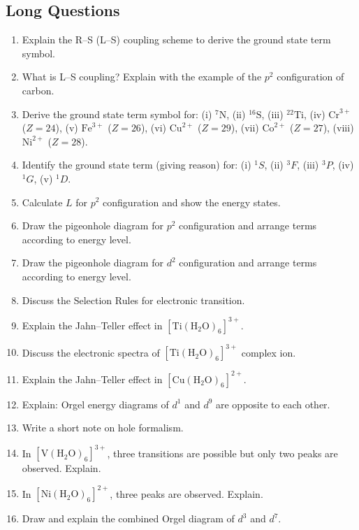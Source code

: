 \documentclass[12pt,a4paper]{article}
\begin{document}
\subsection*{Long Questions}

\begin{enumerate}
  \item Explain the R--S (L--S) coupling scheme to derive the ground state term symbol.
  \item What is L--S coupling? Explain with the example of the $p^2$ configuration of carbon.
  \item Derive the ground state term symbol for: (i) $^7\mathrm{N}$, (ii) $^{16}\mathrm{S}$, (iii) $^{22}\mathrm{Ti}$, (iv) $\mathrm{Cr}^{3+}$ ($Z=24$), (v) $\mathrm{Fe}^{3+}$ ($Z=26$), (vi) $\mathrm{Cu}^{2+}$ ($Z=29$), (vii) $\mathrm{Co}^{2+}$ ($Z=27$), (viii) $\mathrm{Ni}^{2+}$ ($Z=28$).
  \item Identify the ground state term (giving reason) for: (i) ${}^1S$, (ii) ${}^3F$, (iii) ${}^3P$, (iv) ${}^1G$, (v) ${}^1D$.
  \item Calculate $L$ for $p^2$ configuration and show the energy states.
  \item Draw the pigeonhole diagram for $p^2$ configuration and arrange terms according to energy level.
  \item Draw the pigeonhole diagram for $d^2$ configuration and arrange terms according to energy level.
  \item Discuss the Selection Rules for electronic transition.
  \item Explain the Jahn--Teller effect in $[\mathrm{Ti(H_2O)_6}]^{3+}$.
  \item Discuss the electronic spectra of $[\mathrm{Ti(H_2O)_6}]^{3+}$ complex ion.
  \item Explain the Jahn--Teller effect in $[\mathrm{Cu(H_2O)_6}]^{2+}$.
  \item Explain: Orgel energy diagrams of $d^1$ and $d^9$ are opposite to each other.
  \item Write a short note on hole formalism.
  \item In $[\mathrm{V(H_2O)_6}]^{3+}$, three transitions are possible but only two peaks are observed. Explain.
  \item In $[\mathrm{Ni(H_2O)_6}]^{2+}$, three peaks are observed. Explain.
  \item Draw and explain the combined Orgel diagram of $d^3$ and $d^7$.
\end{enumerate}
\end{document}
